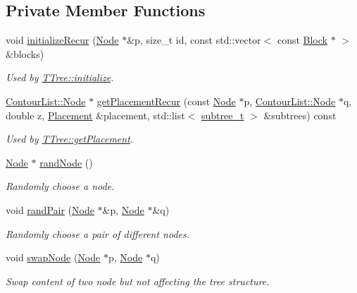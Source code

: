 \subsection*{Private Member Functions}
\begin{DoxyCompactItemize}
\item 
void \hyperlink{classTTree_aa4a9d2b247a7f9c33d1834fd23de7cca}{initialize\+Recur} (\hyperlink{structTTree_1_1Node}{Node} $\ast$\&p, size\+\_\+t id, const std\+::vector$<$ const \hyperlink{structBlock}{Block} $\ast$ $>$ \&blocks)
\begin{DoxyCompactList}\small\item\em Used by \hyperlink{classTTree_a7be152bf003a3b7a41a0d2f2b8a60dcb}{T\+Tree\+::initialize}. \end{DoxyCompactList}\item 
\hyperlink{structContourList_1_1Node}{Contour\+List\+::\+Node} $\ast$ \hyperlink{classTTree_a99a5f5452d13f1a3e4b74f8275224beb}{get\+Placement\+Recur} (const \hyperlink{structTTree_1_1Node}{Node} $\ast$p, \hyperlink{structContourList_1_1Node}{Contour\+List\+::\+Node} $\ast$q, double z, \hyperlink{classPlacement}{Placement} \&placement, std\+::list$<$ \hyperlink{structTTree_1_1subtree__t}{subtree\+\_\+t} $>$ \&subtrees) const 
\begin{DoxyCompactList}\small\item\em Used by \hyperlink{classTTree_a7e34e70567be7961d4a5683010746aae}{T\+Tree\+::get\+Placement}. \end{DoxyCompactList}\item 
\hyperlink{structTTree_1_1Node}{Node} $\ast$ \hyperlink{classTTree_acd9ed57c09bb59a5fcf618b8e215d584}{rand\+Node} ()
\begin{DoxyCompactList}\small\item\em Randomly choose a node. \end{DoxyCompactList}\item 
void \hyperlink{classTTree_aa756d0b900bc757b8095993d86fa5bd9}{rand\+Pair} (\hyperlink{structTTree_1_1Node}{Node} $\ast$\&p, \hyperlink{structTTree_1_1Node}{Node} $\ast$\&q)
\begin{DoxyCompactList}\small\item\em Randomly choose a pair of different nodes. \end{DoxyCompactList}\item 
void \hyperlink{classTTree_adbb05d027840467cdce8b9489bc49225}{swap\+Node} (\hyperlink{structTTree_1_1Node}{Node} $\ast$p, \hyperlink{structTTree_1_1Node}{Node} $\ast$q)
\begin{DoxyCompactList}\small\item\em Swap content of two node but not affecting the tree structure. \end{DoxyCompactList}\item 

\end{DoxyCompactItemize}
